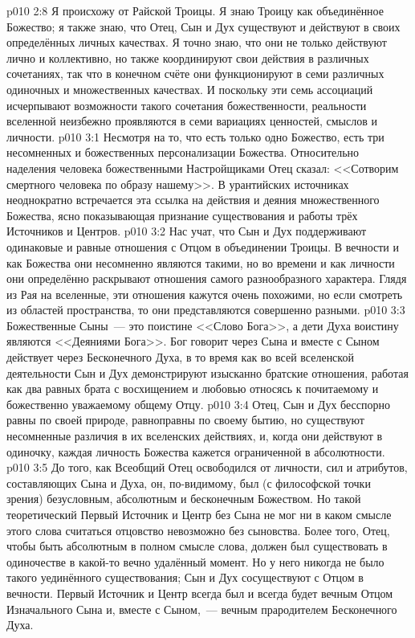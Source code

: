 \vs p010 2:8 Я происхожу от Райской Троицы. Я знаю Троицу как объединённое Божество; я также знаю, что Отец, Сын и Дух существуют и действуют в своих определённых личных качествах. Я точно знаю, что они не только действуют лично и коллективно, но также координируют свои действия в различных сочетаниях, так что в конечном счёте они функционируют в семи различных одиночных и множественных качествах. И поскольку эти семь ассоциаций исчерпывают возможности такого сочетания божественности, реальности вселенной неизбежно проявляются в семи вариациях ценностей, смыслов и личности.
\vs p010 3:1 Несмотря на то, что есть только одно Божество, есть три несомненных и божественных персонализации Божества. Относительно наделения человека божественными Настройщиками Отец сказал: <<Сотворим смертного человека по образу нашему>>. В урантийских источниках неоднократно встречается эта ссылка на действия и деяния множественного Божества, ясно показывающая признание существования и работы трёх Источников и Центров.
\vs p010 3:2 \pc Нас учат, что Сын и Дух поддерживают одинаковые и равные отношения с Отцом в объединении Троицы. В вечности и как Божества они несомненно являются такими, но во времени и как личности они определённо раскрывают отношения самого разнообразного характера. Глядя из Рая на вселенные, эти отношения кажутся очень похожими, но если смотреть из областей пространства, то они представляются совершенно разными.
\vs p010 3:3 Божественные Сыны~--- это поистине <<Слово Бога>>, а дети Духа воистину являются <<Деяниями Бога>>. Бог говорит через Сына и вместе с Сыном действует через Бесконечного Духа, в то время как во всей вселенской деятельности Сын и Дух демонстрируют изысканно братские отношения, работая как два равных брата с восхищением и любовью относясь к почитаемому и божественно уважаемому общему Отцу.
\vs p010 3:4 Отец, Сын и Дух бесспорно равны по своей природе, равноправны по своему бытию, но существуют несомненные различия в их вселенских действиях, и, когда они действуют в одиночку, каждая личность Божества кажется ограниченной в абсолютности.
\vs p010 3:5 \pc До того, как Всеобщий Отец освободился от личности, сил и атрибутов, составляющих Сына и Духа, он, по\hyp{}видимому, был (с философской точки зрения) безусловным, абсолютным и бесконечным Божеством. Но такой теоретический Первый Источник и Центр без Сына не мог ни в каком смысле этого слова считаться  отцовство невозможно без сыновства. Более того, Отец, чтобы быть абсолютным в полном смысле слова, должен был существовать в одиночестве в какой\hyp{}то вечно удалённый момент. Но у него никогда не было такого уединённого существования; Сын и Дух сосуществуют с Отцом в вечности. Первый Источник и Центр всегда был и всегда будет вечным Отцом Изначального Сына и, вместе с Сыном,~--- вечным прародителем Бесконечного Духа.
